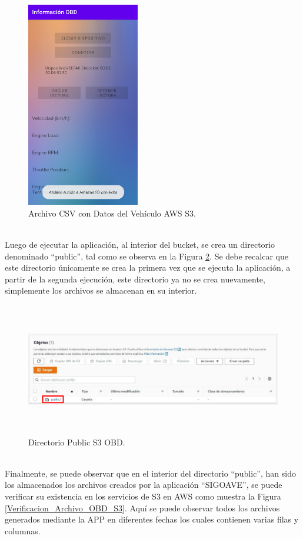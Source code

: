 \documentclass[a4paper,10pt, oneside, titlepage]{article}
\begin{document}
	\begin{figure}[!h]
		\centering
		\includegraphics[width = 0.45\linewidth, height = 9cm]{Archivo_CSV_OBD_Subido_S3.png}
		\caption{Archivo CSV con Datos del Vehículo AWS S3.}
		\label{Archivo_CSV_OBD_Subido_S3}
	\end{figure} \\
	\indent  Luego de ejecutar la aplicación, al interior del bucket, se crea un directorio denominado ``public'', tal como se observa en la Figura \ref{Directorio_Public_S3_OBD}. Se debe recalcar que este directorio únicamente se crea la primera vez que se ejecuta la aplicación, a partir de la segunda ejecución, este directorio ya no se crea nuevamente, simplemente los archivos se almacenan en su interior.
	\begin{figure}[!h]
		\centering
		\includegraphics[width = 1\linewidth, height = 5.8cm]{Directorio_Public_S3_OBD.png}
		\caption{Directorio Public S3 OBD.}
		\label{Directorio_Public_S3_OBD}
	\end{figure} \\
	Finalmente, se puede observar que en el interior del directorio ``public'', han sido los almacenados los archivos creados por la aplicación ``SIGOAVE'', se puede verificar su existencia en los servicios de S3 en AWS como muestra la Figura \ref{Verificacion_Archivo_OBD_S3}. Aquí se puede observar todos los archivos generados mediante la APP en diferentes fechas los cuales contienen varias filas y columnas.
\end{document}
